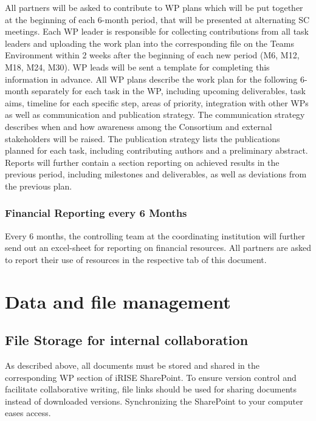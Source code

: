 \documentclass[
]{article}
\begin{document}
All partners will be asked to contribute to WP plans which will be put together at the beginning of each 6-month period, that will be presented at alternating SC meetings. Each WP leader is responsible for collecting contributions from all task leaders and uploading the work plan into the corresponding file on the Teams Environment within 2 weeks after the beginning of each new period (M6, M12, M18, M24, M30). WP leads will be sent a template for completing this information in advance. All WP plans describe the work plan for the following 6-month separately for each task in the WP, including upcoming deliverables, task aims, timeline for each specific step, areas of priority, integration with other WPs as well as communication and publication strategy. The communication strategy describes when and how awareness among the Consortium and external stakeholders will be raised. The publication strategy lists the publications planned for each task, including contributing authors and a preliminary abstract. Reports will further contain a section reporting on achieved results in the previous period, including milestones and deliverables, as well as deviations from the previous plan.

\hypertarget{financial-reporting-every-6-months}{%
\subsubsection{Financial Reporting every 6 Months}\label{financial-reporting-every-6-months}}

Every 6 months, the controlling team at the coordinating institution will further send out an excel-sheet for reporting on financial resources. All partners are asked to report their use of resources in the respective tab of this document.

\hypertarget{data-and-file-management}{%
\section{\texorpdfstring{\textbf{Data and file management}}{Data and file management}}\label{data-and-file-management}}

\hypertarget{file-storage-for-internal-collaboration}{%
\subsection{File Storage for internal collaboration}\label{file-storage-for-internal-collaboration}}

As described above, all documents must be stored and shared in the corresponding WP section of iRISE SharePoint. To ensure version control and facilitate collaborative writing, file links should be used for sharing documents instead of downloaded versions. Synchronizing the SharePoint to your computer eases access.
\end{document}
